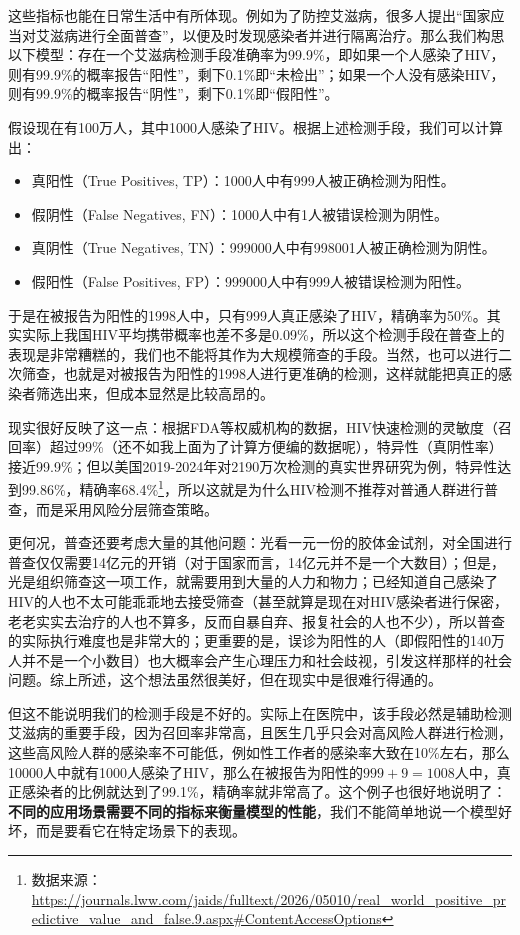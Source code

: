 这些指标也能在日常生活中有所体现。例如为了防控艾滋病，很多人提出“国家应当对艾滋病进行全面普查”，以便及时发现感染者并进行隔离治疗。那么我们构思以下模型：存在一个艾滋病检测手段准确率为99.9\%，即如果一个人感染了HIV，则有99.9\%的概率报告“阳性”，剩下0.1\%即“未检出”；如果一个人没有感染HIV，则有99.9\%的概率报告“阴性”，剩下0.1\%即“假阳性”。

假设现在有100万人，其中1000人感染了HIV。根据上述检测手段，我们可以计算出：
\begin{itemize}
    \item 真阳性（True Positives, TP）：1000人中有999人被正确检测为阳性。
    \item 假阴性（False Negatives, FN）：1000人中有1人被错误检测为阴性。
    \item 真阴性（True Negatives, TN）：999000人中有998001人被正确检测为阴性。
    \item 假阳性（False Positives, FP）：999000人中有999人被错误检测为阳性。
\end{itemize}
于是在被报告为阳性的1998人中，只有999人真正感染了HIV，精确率为50\%。其实实际上我国HIV平均携带概率也差不多是0.09\%，所以这个检测手段在普查上的表现是非常糟糕的，我们也不能将其作为大规模筛查的手段。当然，也可以进行二次筛查，也就是对被报告为阳性的1998人进行更准确的检测，这样就能把真正的感染者筛选出来，但成本显然是比较高昂的。

现实很好反映了这一点：根据FDA等权威机构的数据，HIV快速检测的灵敏度（召回率）超过99\%（还不如我上面为了计算方便编的数据呢），特异性（真阴性率）接近99.9\%；但以美国2019-2024年对2190万次检测的真实世界研究为例，特异性达到99.86\%，精确率68.4\%\footnote{数据来源：\url{https://journals.lww.com/jaids/fulltext/2026/05010/real_world_positive_predictive_value_and_false.9.aspx\#ContentAccessOptions}}，所以这就是为什么HIV检测不推荐对普通人群进行普查，而是采用风险分层筛查策略。

更何况，普查还要考虑大量的其他问题：光看一元一份的胶体金试剂，对全国进行普查仅仅需要14亿元的开销（对于国家而言，14亿元并不是一个大数目）；但是，光是组织筛查这一项工作，就需要用到大量的人力和物力；已经知道自己感染了HIV的人也不太可能乖乖地去接受筛查（甚至就算是现在对HIV感染者进行保密，老老实实去治疗的人也不算多，反而自暴自弃、报复社会的人也不少），所以普查的实际执行难度也是非常大的；更重要的是，误诊为阳性的人（即假阳性的140万人并不是一个小数目）也大概率会产生心理压力和社会歧视，引发这样那样的社会问题。综上所述，这个想法虽然很美好，但在现实中是很难行得通的。

但这不能说明我们的检测手段是不好的。实际上在医院中，该手段必然是辅助检测艾滋病的重要手段，因为召回率非常高，且医生几乎只会对高风险人群进行检测，这些高风险人群的感染率不可能低，例如性工作者的感染率大致在10\%左右，那么10000人中就有1000人感染了HIV，那么在被报告为阳性的$999+9 = 1008$人中，真正感染者的比例就达到了99.1\%，精确率就非常高了。这个例子也很好地说明了：\textbf{不同的应用场景需要不同的指标来衡量模型的性能}，我们不能简单地说一个模型好坏，而是要看它在特定场景下的表现。

